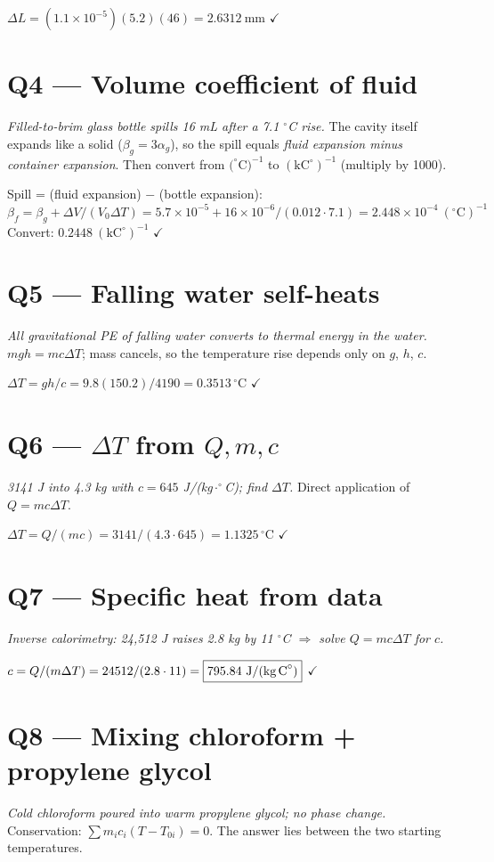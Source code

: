 \documentclass[11pt]{article}
\newcommand{\checkmk}{\ensuremath{\checkmark}}
\begin{document}
$\Delta L = (1.1\times10^{-5})(5.2)(46) = \boxed{2.6312\ \text{mm}}$ \checkmk

\section*{Q4 --- Volume coefficient of fluid}
\emph{Filled-to-brim glass bottle spills 16 mL after a 7.1 $^\circ$C rise.} The cavity itself expands like a solid ($\beta_g = 3\alpha_g$), so the spill equals \emph{fluid expansion minus container expansion}. Then convert from $(^\circ$C$)^{-1}$ to $(\text{kC}^\circ)^{-1}$ (multiply by 1000).

Spill = (fluid expansion) $-$ (bottle expansion):
$\beta_f = \beta_g + \Delta V/(V_0\Delta T) = 5.7\times10^{-5} + 16\times10^{-6}/(0.012\cdot 7.1) = 2.448\times10^{-4}\ (^\circ\text{C})^{-1}$
Convert: $\boxed{0.2448\ (\text{kC}^\circ)^{-1}}$ \checkmk

\section*{Q5 --- Falling water self-heats}
\emph{All gravitational PE of falling water converts to thermal energy in the water.} $mgh = mc\Delta T$; mass cancels, so the temperature rise depends only on $g$, $h$, $c$.

$\Delta T = gh/c = 9.8(150.2)/4190 = \boxed{0.3513\,^\circ\text{C}}$ \checkmk

\section*{Q6 --- $\Delta T$ from $Q,m,c$}
\emph{3141 J into 4.3 kg with $c = 645$ J/(kg$\cdot^\circ$C); find $\Delta T$.} Direct application of $Q=mc\Delta T$.

$\Delta T = Q/(mc) = 3141/(4.3\cdot 645) = \boxed{1.1325\,^\circ\text{C}}$ \checkmk

\section*{Q7 --- Specific heat from data}
\emph{Inverse calorimetry: 24,512 J raises 2.8 kg by 11 $^\circ$C $\Rightarrow$ solve $Q=mc\Delta T$ for $c$.}

$c = Q/(m\Delta T) = 24512/(2.8\cdot 11) = \boxed{795.84\ \text{J/(kg\,C}^\circ)}$ \checkmk

\section*{Q8 --- Mixing chloroform + propylene glycol}
\emph{Cold chloroform poured into warm propylene glycol; no phase change.} Conservation: $\sum m_i c_i(T-T_{0i}) = 0$. The answer lies between the two starting temperatures.
\end{document}
